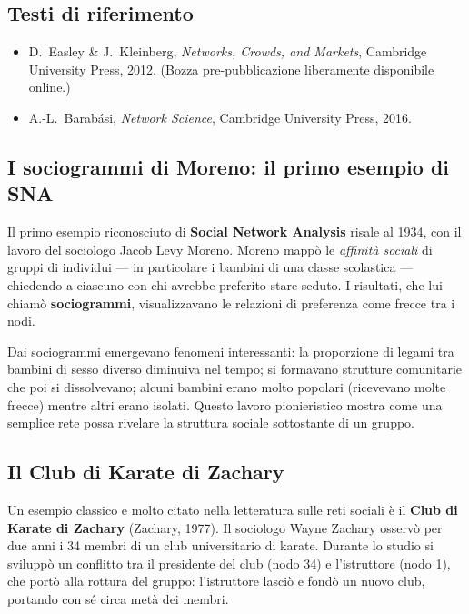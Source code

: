 \documentclass[12pt,a4paper]{article}
\begin{document}
\subsection{Testi di riferimento}

\begin{itemize}
  \item D.~Easley \& J.~Kleinberg, \textit{Networks, Crowds, and Markets}, Cambridge
        University Press, 2012. (Bozza pre-pubblicazione liberamente disponibile online.)
  \item A.-L.~Barabási, \textit{Network Science}, Cambridge University Press, 2016.
\end{itemize}

\subsection{I sociogrammi di Moreno: il primo esempio di SNA}

Il primo esempio riconosciuto di \textbf{Social Network Analysis} risale al 1934, con il
lavoro del sociologo Jacob Levy Moreno. Moreno mappò le \emph{affinità sociali} di gruppi
di individui — in particolare i bambini di una classe scolastica — chiedendo a ciascuno con
chi avrebbe preferito stare seduto. I risultati, che lui chiamò \textbf{sociogrammi},
visualizzavano le relazioni di preferenza come frecce tra i nodi.

Dai sociogrammi emergevano fenomeni interessanti: la proporzione di legami tra bambini di
sesso diverso diminuiva nel tempo; si formavano strutture comunitarie che poi si dissolvevano;
alcuni bambini erano molto popolari (ricevevano molte frecce) mentre altri erano isolati.
Questo lavoro pionieristico mostra come una semplice rete possa rivelare la struttura
sociale sottostante di un gruppo.

\subsection{Il Club di Karate di Zachary}

Un esempio classico e molto citato nella letteratura sulle reti sociali è il
\textbf{Club di Karate di Zachary} (Zachary, 1977). Il sociologo Wayne Zachary
osservò per due anni i 34 membri di un club universitario di karate.
Durante lo studio si sviluppò un conflitto tra il presidente del club (nodo 34) e
l'istruttore (nodo 1), che portò alla rottura del gruppo: l'istruttore lasciò e
fondò un nuovo club, portando con sé circa metà dei membri.
\end{document}
